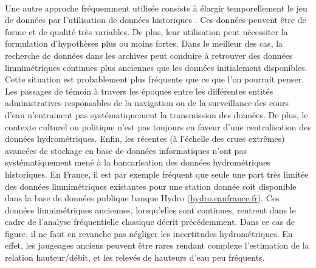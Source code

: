 \documentclass[11pt]{article}
\begin{document}
	\paragraph{} Une autre approche fréquemment utilisée consiste à élargir temporellement le jeu de données par l'utilisation de données historiques \citep{brazdil_historical_2006}. Ces données peuvent être de forme et de qualité très variables. De plus, leur utilisation peut nécessiter la formulation d'hypothèses plus ou moins fortes. Dans le meilleur des cas, la recherche de données dans les archives peut conduire à retrouver des données limnimétriques continues plus anciennes que les données initialement disponibles. Cette situation est probablement plus fréquente que ce que l'on pourrait penser. Les passages de témoin à travers les époques entre les différentes entités administratives responsables de la navigation ou de la surveillance des cours d'eau n'entrainent pas systématiquement la transmission des données. De plus, le contexte culturel ou politique n'est pas toujours en faveur d'une centralisation des données hydrométriques. Enfin, les récentes (à l'échelle des crues extrêmes) avancées de stockage en base de données informatiques n'ont pas systématiquement mené à la bancarisation des données hydrométriques historiques. En France, il est par exemple fréquent que seule une part très limitée des données limnimétriques existantes pour une station donnée soit disponible dans la base de données publique banque Hydro (\url{hydro.eaufrance.fr}). Ces données limnimétriques anciennes, lorsqu'elles sont continues, rentrent dans le cadre de l'analyse fréquentielle classique décrit précédemment. Dans ce cas de figure, il ne faut en revanche pas négliger les incertitudes hydrométriques. En effet, les jaugeages anciens peuvent être rares rendant complexe l'estimation de la relation hauteur/débit, et les relevés de hauteurs d'eau peu fréquents.
	
\end{document}
